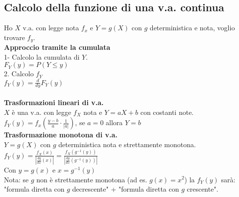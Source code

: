 \documentclass{article}
\begin{document}
\begin{multicols*}{3}
		\subsection{Calcolo della funzione di una v.a. continua}
		Ho \(X\) v.a. con legge nota \(f_x\) e \(Y=g(X)\) con \(g\) deterministica e nota, voglio trovare \(f_y\).\\
		\textbf{Approccio tramite la cumulata}\\
		1- Calcolo la cumulata di \(Y\).\\
		\(F_Y(y) = P(Y\leq y)\)\\
		2. Calcolo \(f_Y\)\\
		\(f_Y (y)= \frac{d}{dy} F_Y (y)\)\\\\
		\textbf{Trasformazioni lineari di v.a.}\\
		\(X\) è una v.a. con legge \(f_X\) nota e \(Y = aX + b\) con costanti note.\\
		\(f_Y(y) = f_x(\frac{y-b}{a}\cdot \frac{1}{|a|})\), se \(a=0\) allora \(Y=b\)\\
		\textbf{Trasformazione monotona di v.a.}\\
		\(Y = g(X) \) con \(g\) deterministica nota e strettamente monotona.\\
		\(f_Y (y) = \frac{f_X (x) }{|\frac{dg}{dx} (x)|} = \frac{f_X (g^{-1} (y))}{|\frac{dg}{dx} (g^{-1} (y))|}\)\\
		Con \(y= g(x)\) e \(x=g^{-1}(y)\)\\
		Nota: se \(g\) non è strettamente monotona (ad es. \(g(x)= x^2\)) la \(f_Y(y) \) sarà: "formula diretta con \(g\) decrescente" + "formula diretta con \(g\) crescente".\\

\end{multicols*}
\end{document}
